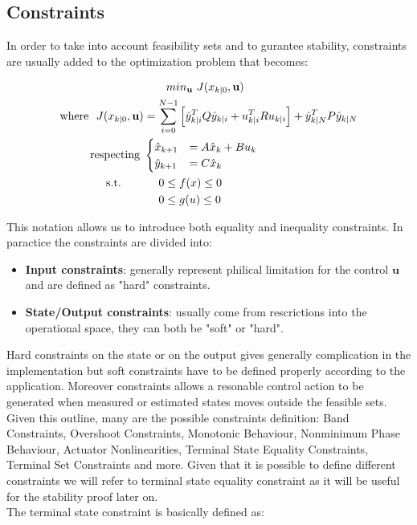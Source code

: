 \subsection{Constraints}

In order to take into account feasibility sets and to gurantee stability, constraints are usually added to the optimization problem that becomes: 

\begin{equation} \label{MPC_problem_constrained}
\begin{split}
		&\qquad min_\textbf{u}\ J(x_{k|0},\textbf{u}) \\
		\textnormal{where}\ \  
		 J(x_{k|0},\textbf{u}) &= \sum_{i=0}^{N-1} \left[\hat{y}_{k|i}^T Q \hat{y}_{k|i} + u_{k|i}^TRu_{k|i} \right] + \hat{y}_{k|N}^T P \hat{y}_{k|N} \\
		\textnormal{respecting}\ &  	
		\begin{cases}
			\hat{x}_{k+1}&=A\hat{x}_k+Bu_k \\
			\hat{y}_{k+1}&=C\hat{x}_k
		\end{cases} \\
		\textnormal{s.t.}\qquad
		&\ \ \ \ 0 \leq f(x)\leq 0 \\
		&\ \ \ \ 0 \leq g(u)\leq 0 \\
	\end{split}	
\end{equation}

This notation allows us to introduce both equality and inequality constraints. In paractice the constraints are divided into: 
\begin{itemize}
 \item \textbf{Input constraints}: generally represent philical limitation for the control $\textbf{u}$ and are defined as "hard" constraints.
 	\item \textbf{State/Output constraints}: usually come from rescrictions into the operational space, they can both be "soft" or "hard".
\end{itemize} 

Hard constraints on the state or on the output gives generally complication in the implementation but soft constraints have to be defined properly according to the application. Moreover constraints allows a resonable control action to be generated when measured or estimated states moves outside the feasible sets. Given this outline, many are the possible constraints definition: Band Constraints, Overshoot Constraints, Monotonic Behaviour, Nonminimum Phase Behaviour, Actuator Nonlinearities, Terminal State Equality Constraints, Terminal Set Constraints and more. Given that it is possible to define different constraints we will refer to terminal state equality constraint as it will be useful for the stability proof later on. \\
The terminal state constraint is basically defined as: 

